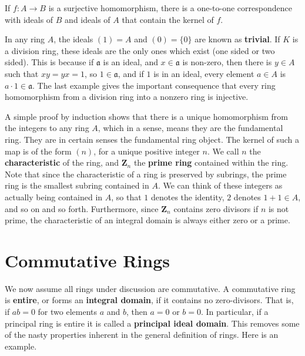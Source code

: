 \begin{theorem}
    If $f:A \to B$ is a surjective homomorphism, there is a one-to-one correspondence with ideals of $B$ and ideals of $A$ that contain the kernel of $f$.
\end{theorem}

\begin{example}
    In any ring $A$, the ideals $(1) = A$ and $(0) = \{ 0 \}$ are known as {\bf trivial}. If $K$ is a division ring, these ideals are the only ones which exist (one sided or two sided). This is because if $\mathfrak{a}$ is an ideal, and $x \in \mathfrak{a}$ is non-zero, then there is $y \in A$ such that $xy = yx = 1$, so $1 \in \mathfrak{a}$, and if $1$ is in an ideal, every element $a \in A$ is $a \cdot 1 \in \mathfrak{a}$. The last example gives the important consequence that every ring homomorphism from a division ring into a nonzero ring is injective.
\end{example}

A simple proof by induction shows that there is a unique homomorphism from the integers to any ring $A$, which in a sense, means they are the fundamental ring. They are in certain senses the fundamental ring object. The kernel of such a map is of the form $(n)$, for a unique positive integer $n$. We call $n$ the {\bf characteristic} of the ring, and $\mathbf{Z}_n$ the {\bf prime ring} contained within the ring. Note that since the characteristic of a ring is preserved by subrings, the prime ring is the smallest subring contained in $A$. We can think of these integers as actually being contained in $A$, so that $1$ denotes the identity, $2$ denotes $1 + 1 \in A$, and so on and so forth. Furthermore, since $\mathbf{Z}_n$ contains zero divisors if $n$ is not prime, the characteristic of an integral domain is always either zero or a prime.

\chapter{Commutative Rings}

We now assume all rings under discussion are commutative. A commutative ring is {\bf entire}, or forms an {\bf integral domain}, if it contains no zero-divisors. That is, if $ab = 0$ for two elements $a$ and $b$, then $a = 0$ or $b = 0$. In particular, if a principal ring is entire it is called a {\bf principal ideal domain}. This removes some of the nasty properties inherent in the general definition of rings. Here is an example.


